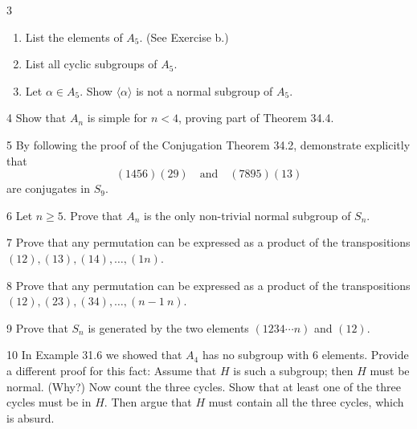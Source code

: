 \begin{problem}{3}
    \begin{enumerate}
        \item[(a)] List the elements of $A_5$. (See Exercise b.)
        \item[(b)] List all cyclic subgroups of $A_5$.
        \item[(c)] Let $\alpha \in A_5$. Show $\langle \alpha \rangle$ is not a normal
        subgroup of $A_5$.
    \end{enumerate}
\end{problem}
\unsolved

\begin{problem}{4}
    Show that $A_n$ is simple for $n < 4$, proving part of Theorem 34.4.
\end{problem}
\unsolved

\begin{problem}{5}
    By following the proof of the Conjugation Theorem 34.2, demonstrate explicitly that
    \[(1456)(29) \quad\text{and}\quad (7895)(13)\]
    are conjugates in $S_9$.
\end{problem}
\unsolved

\begin{problem}{6}
    Let $n \ge 5$. Prove that $A_n$ is the only non-trivial normal subgroup of $S_n$.
\end{problem}
\unsolved

\begin{problem}{7}
    Prove that any permutation can be expressed as a product of the transpositions
    $(12), (13), (14), \ldots, (1n)$.
\end{problem}
\unsolved

\begin{problem}{8}
    Prove that any permutation can be expressed as a product of the transpositions
    $(12), (23), (34), \ldots, (n - 1\ n)$.
\end{problem}
\unsolved

\begin{problem}{9}
    Prove that $S_n$ is generated by the two elements $(1234\cdots n)$ and $(12)$.
\end{problem}
\unsolved

\begin{problem}{10}
    In Example 31.6 we showed that $A_4$ has no subgroup with 6 elements. Provide a
    different proof for this fact: Assume that $H$ is such a subgroup; then $H$ must be
    normal. (Why?) Now count the three cycles. Show that at least one of the three cycles
    must be in $H$. Then argue that $H$ must contain all the three cycles, which is absurd.
\end{problem}
\unsolved

